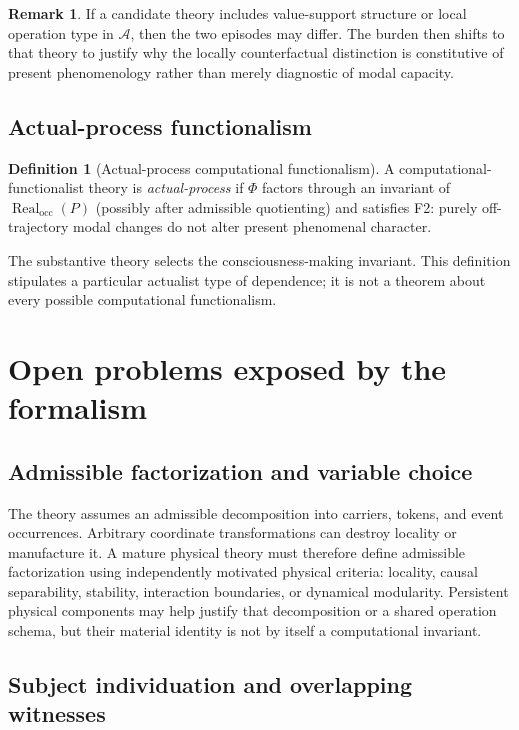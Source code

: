 \documentclass[11pt,a4paper]{article}
\theoremstyle{clean}
\theoremstyle{definition}
\newtheorem{definition}[theorem]{Definition}
\newtheorem{remark}[theorem]{Remark}
\newcommand{\Real}{\operatorname{Real}}
\newcommand{\Occ}{\mathrm{occ}}
\begin{document}
\begin{remark}
If a candidate theory includes value-support structure or local operation type in $\mathcal A$, then the two episodes may differ. The burden then shifts to that theory to justify why the locally counterfactual distinction is constitutive of present phenomenology rather than merely diagnostic of modal capacity.
\end{remark}

\subsection{Actual-process functionalism}

\begin{definition}[Actual-process computational functionalism]
A computational-functionalist theory is \emph{actual-process} if $\Phi$ factors through an invariant of $\Real_\Occ(P)$ (possibly after admissible quotienting) and satisfies F2: purely off-trajectory modal changes do not alter present phenomenal character.
\end{definition}

The substantive theory selects the consciousness-making invariant. This definition stipulates a particular actualist type of dependence; it is not a theorem about every possible computational functionalism.

\section{Open problems exposed by the formalism}

\subsection{Admissible factorization and variable choice}

The theory assumes an admissible decomposition into carriers, tokens, and event occurrences. Arbitrary coordinate transformations can destroy locality or manufacture it. A mature physical theory must therefore define admissible factorization using independently motivated physical criteria: locality, causal separability, stability, interaction boundaries, or dynamical modularity. Persistent physical components may help justify that decomposition or a shared operation schema, but their material identity is not by itself a computational invariant.

\subsection{Subject individuation and overlapping witnesses}
\end{document}
